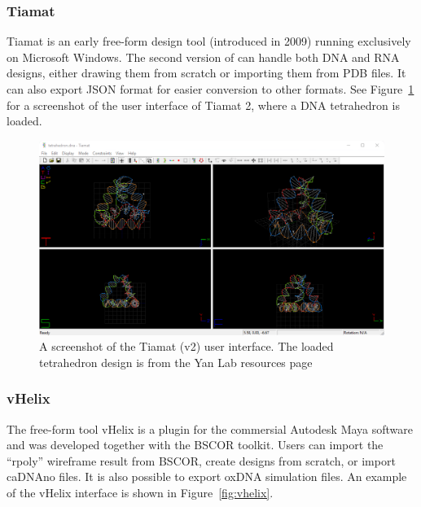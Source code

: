 \subsubsection{Tiamat}
\label{sec:tiamat}
Tiamat is an early free-form design tool (introduced in 2009) \cite{Tiamat} running exclusively on Microsoft Windows. The second version of can handle both DNA and RNA designs, either drawing them from scratch or importing them from PDB files. It can also export JSON format for easier conversion to other formats. See Figure~\ref{fig:tiamat} for a screenshot of the user interface of Tiamat 2, where a DNA tetrahedron is loaded.

\begin{figure}[ht]
  \begin{center}
    \includegraphics[width=\textwidth]{figures/tiamat_ui.png}
    \caption{A screenshot of the Tiamat \cite{Tiamat} (v2) user interface. The loaded tetrahedron design is from the Yan Lab resources page \cite{tiamatWeb}}
    \label{fig:tiamat}
  \end{center}
\end{figure}

\subsubsection{vHelix}
\label{sec:vhelix}
The free-form tool vHelix \cite{vHelix} is a plugin for the commersial Autodesk Maya software and was developed together with the BSCOR toolkit. Users can import the ``rpoly'' wireframe result from BSCOR, create designs from scratch, or import caDNAno files. It is also possible to export oxDNA simulation files. An example of the vHelix interface is shown in Figure~\ref{fig:vhelix}. 

